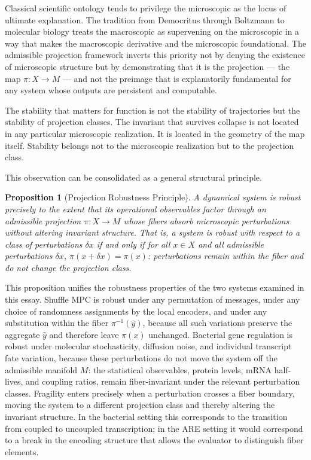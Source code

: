 \documentclass[12pt, a4paper]{article}
\theoremstyle{essaystyle}
\newtheorem{proposition}{Proposition}
\begin{document}
Classical scientific ontology tends to privilege the microscopic as the locus of
ultimate explanation. The tradition from Democritus through Boltzmann to molecular
biology treats the macroscopic as supervening on the microscopic in a way that makes
the macroscopic derivative and the microscopic foundational. The admissible projection
framework inverts this priority not by denying the existence of microscopic structure
but by demonstrating that it is the projection --- the map $\pi : X \to M$ --- and not
the preimage that is explanatorily fundamental for any system whose outputs are
persistent and computable.

The stability that matters for function is not the stability of trajectories but the
stability of projection classes. The invariant that survives collapse is not located in
any particular microscopic realization. It is located in the geometry of the map itself.
Stability belongs not to the microscopic realization but to the projection class.

This observation can be consolidated as a general structural principle.

\begin{proposition}[Projection Robustness Principle]
A dynamical system is robust precisely to the extent that its operational observables
factor through an admissible projection $\pi : X \to M$ whose fibers absorb microscopic
perturbations without altering invariant structure. That is, a system is robust with
respect to a class of perturbations $\delta x$ if and only if for all $x \in X$ and
all admissible perturbations $\delta x$, $\pi(x + \delta x) = \pi(x)$: perturbations
remain within the fiber and do not change the projection class.
\end{proposition}

This proposition unifies the robustness properties of the two systems examined in this
essay. Shuffle MPC is robust under any permutation of messages, under any choice of
randomness assignments by the local encoders, and under any substitution within the
fiber $\pi^{-1}(\hat{y})$, because all such variations preserve the aggregate $\hat{y}$
and therefore leave $\pi(x)$ unchanged. Bacterial gene regulation is robust under
molecular stochasticity, diffusion noise, and individual transcript fate variation,
because these perturbations do not move the system off the admissible manifold $M$:
the statistical observables, protein levels, mRNA half-lives, and coupling ratios,
remain fiber-invariant under the relevant perturbation classes. Fragility enters
precisely when a perturbation crosses a fiber boundary, moving the system to a
different projection class and thereby altering the invariant structure. In the
bacterial setting this corresponds to the transition from coupled to uncoupled
transcription; in the ARE setting it would correspond to a break in the encoding
structure that allows the evaluator to distinguish fiber elements.
\end{document}
